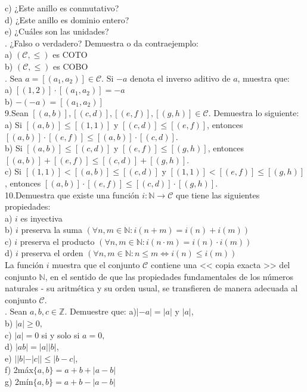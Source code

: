 \documentclass[letterpaper]{article}
\newcommand{\C}{\mathcal{C}}
\newcommand{\N}{\mathds{N}}
\newcommand{\Z}{\mathds{Z}}
\renewcommand{\*}{\cdot}
\theoremstyle{definition}
\begin{document}
c) ¿Este anillo es conmutativo?\\
d) ¿Este anillo es dominio entero?\\
e) ¿Cuáles son las unidades?\\
. ¿Falso o verdadero? Demuestra o da contraejemplo:\\
a) $ (\C, \leq) $ es COTO\\
b) $ (\C, \leq) $ es COBO\\
. Sea $ a = [(a_1, a_2)] \in \C $. Si $ -a $ denota el inverso aditivo de $ a $, muestra que:\\
a) $ [(1,2)] \* [(a_1,a_2)] =  -a$\\
b) $ -(-a) = [(a_1,a_2)]$\\
\noindent9.Sean $ [(a,b)], [(c,d)], [(e,f)], [(g,h)] \in \C $. Demuestra lo siguiente:\\
a) Si $ [(a, b)] \leq [(1,1)] $ y $ [(c,d)] \leq [( e,f)] $, entonces $ [(a,b)] \* [( e,f )] \leq [(a,b)] \* [(c,d)] $.\\
b) Si $ [(a, b)] \leq [(c,d)] $ y $ [(e,f)] \leq [( g,h)] $, entonces $ [(a,b)] + [( e,f )] \leq [(c,d)] + [(g,h)] $.\\
c) Si $ [(1,1)] < [(a, b)] \leq [(c,d)] $ y $ [(1,1)] < [(e,f)] \leq [( g,h)] $, entonces $ [(a,b)] \* [( e,f )] \leq [(c,d)] \* [(g,h)] $.\\

\noindent10.Demuestra que existe una función $ i: \N \rightarrow \C $ que tiene las siguientes propiedades:\\
a) $ i $ es inyectiva\\
b) $ i $ preserva la suma $ \left( \forall n,m \in \N: i(n + m) = i(n) + i(m)  \right) $\\
c) $ i $ preserva el producto $ \left( \forall n,m \in \N: i(n \* m) = i(n) \* i(m)  \right) $\\
d) $ i $ preserva el orden $ \left( \forall n,m \in \N: n \leq m \Longleftrightarrow i(n) \leq i(m)  \right) $\\
La función $ i $ muestra que el conjunto $ \C $ contiene una << copia exacta >> del conjunto $ \N $, en el sentido de que las propiedades fundamentales de los números naturales - su aritmética y su orden usual, se transfieren de manera adecuada al conjunto $ \C $.\\


. Sean $ a,b,c \in \Z $. Demuestre que:
a)$ | -a| = |a|  $ y $ |a| $,\\
b) $ |a| \geq 0, $\\
c) $ |a| = 0$ si y solo si $ a = 0, $\\
d) $ |ab| = |a||b| $,\\
e) $ ||b|-|c|| \leq |b-c| $,\\
f) 2máx$ \{a,b \}  = a + b + |a - b|$\\
g) 2mín$ \{a,b \}  = a + b - |a - b|$\\
\end{document}
